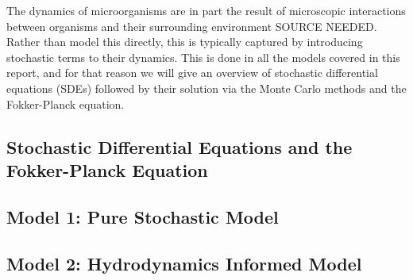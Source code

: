 The dynamics of microorganisms are in part the result of microscopic interactions between organisms and their
surrounding environment SOURCE NEEDED. Rather than model this directly, this is typically captured by introducing
stochastic terms to their dynamics. This is done in all the models covered in this report, and for that reason we will give an 
overview of stochastic differential equations (SDEs) followed by their solution via the Monte Carlo methods and the
Fokker-Planck equation.

\subsection{Stochastic Differential Equations and the Fokker-Planck Equation}


\subsection{Model 1: Pure Stochastic Model}\label{sec:pure_stoch_model}


\subsection{Model 2: Hydrodynamics Informed Model}\label{sec:hydrodynamic_model}

